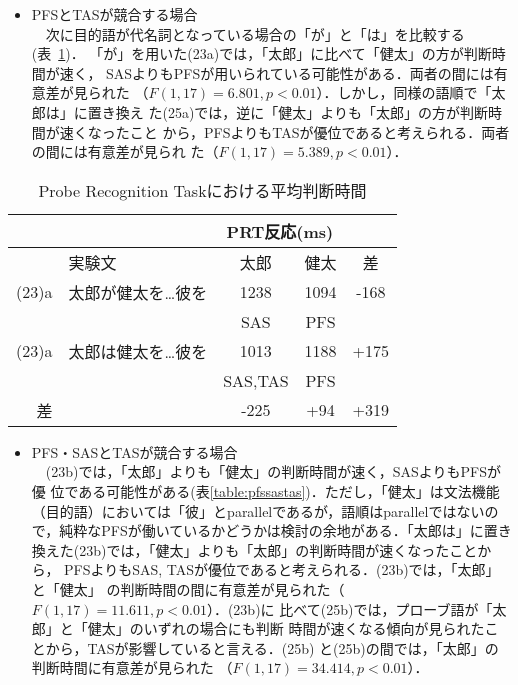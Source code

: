 \begin{itemize}
  \item PFSとTASが競合する場合\\
　次に目的語が代名詞となっている場合の「が」と「は」を比較する(表~\ref{table:pfstas})．
「が」を用いた(23a)では，「太郎」に比べて「健太」の方が判断時間が速く，
SASよりもPFSが用いられている可能性がある．両者の間には有意差が見られた
（$F(1,17)=6.801, p<0.01$）．しかし，同様の語順で「太郎は」に置き換え
た(25a)では，逆に「健太」よりも「太郎」の方が判断時間が速くなったこと
から，PFSよりもTASが優位であると考えられる．両者の間には有意差が見られ
た（$F(1,17)=5.389, p<0.01$）．
\end{itemize}

\begin{table}
\begin{center}
\caption{Probe Recognition Taskにおける平均判断時間}
\label{table:pfstas}
\begin{tabular}{|r|l|c|c|c|} \hline
    \multicolumn{2}{|c|}{} & \multicolumn{2}{c|}{PRT反応(ms)} &   \\ \hline
      & 実験文 & 太郎 & 健太 & 差 \\ \hline
(23)a & 太郎が健太を\ldots 彼を & 1238 &1094 & -168 \\
      &                         & SAS & PFS & \\ \hline
(23)a & 太郎は健太を\ldots 彼を & 1013 & 1188 & +175 \\
      &                    & SAS,TAS & PFS & \\ \hline
  差  &                    & -225 & +94 & +319\\ \hline
\end{tabular}
\end{center}
\end{table}

\begin{itemize}
  \item PFS・SASとTASが競合する場合\\
　(23b)では，「太郎」よりも「健太」の判断時間が速く，SASよりもPFSが優
位である可能性がある(表\ref{table:pfssastas})．ただし，「健太」は文法機能
（目的語）においては「彼」とparallelであるが，語順はparallelではないの
で，純粋なPFSが働いているかどうかは検討の余地がある．「太郎は」に置き
換えた(23b)では，「健太」よりも「太郎」の判断時間が速くなったことから，
PFSよりもSAS, TASが優位であると考えられる．(23b)では，「太郎」と「健太」
の判断時間の間に有意差が見られた（$F(1,17)=11.611, p<0.01$）．(23b)に
比べて(25b)では，プローブ語が「太郎」と「健太」のいずれの場合にも判断
時間が速くなる傾向が見られたことから，TASが影響していると言える．(25b)
と(25b)の間では，「太郎」の判断時間に有意差が見られた
（$F(1,17)=34.414,p<0.01$）． 
\end{itemize}

